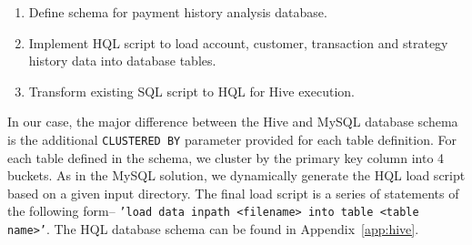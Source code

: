 \begin{enumerate}
 \item Define schema for payment history analysis database.
 \item Implement HQL script to load account, customer, transaction and strategy history data into database tables.
 \item Transform existing SQL script to HQL for Hive execution.
\end{enumerate}

In our case, the major difference between the Hive and MySQL database schema is the additional \texttt{CLUSTERED BY} parameter provided for each table definition. For each table defined in the schema, we cluster by the primary key column into 4 buckets. As in the MySQL solution, we dynamically generate the HQL load script based on a given input directory. The final load script is a series of statements of the following form-- \texttt{'load data inpath <filename> into table <table name>'}. The HQL database schema can be found in Appendix~\ref{app:hive}. 
